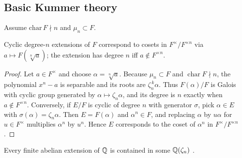 \subsection{Basic Kummer theory}
Assume $\mathrm{char}\,F\nmid n$ and $\mu_n\subset F$.
\begin{theorem}[Kummer]
Cyclic degree-$n$ extensions of $F$ correspond to cosets in $F^\times/F^{\times n}$ via $a\mapsto F(\sqrt[n]{a})$; the extension has degree $n$ iff $a\notin F^{\times n}$.
\end{theorem}
\begin{proof}
Let $a\in F^\times$ and choose $\alpha=\sqrt[n]{a}$. Because $\mu_n\subset F$ and $\operatorname{char}F\nmid n$, the polynomial $x^n-a$ is separable and its roots are $\zeta_n^{\,k}\alpha$. Thus $F(\alpha)/F$ is Galois with cyclic group generated by $\alpha\mapsto\zeta_n\alpha$, and its degree is $n$ exactly when $a\notin F^{\times n}$. Conversely, if $E/F$ is cyclic of degree $n$ with generator $\sigma$, pick $\alpha\in E$ with $\sigma(\alpha)=\zeta_n\alpha$. Then $E=F(\alpha)$ and $\alpha^n\in F$, and replacing $\alpha$ by $u\alpha$ for $u\in F^\times$ multiplies $\alpha^n$ by $u^n$. Hence $E$ corresponds to the coset of $\alpha^n$ in $F^\times/F^{\times n}$.
\end{proof}
\begin{remark}
Every finite abelian extension of $\mathbb{Q}$ is contained in some $\mathbb{Q}(\zeta_n)$ \cite{Neukirch}.
\end{remark}
